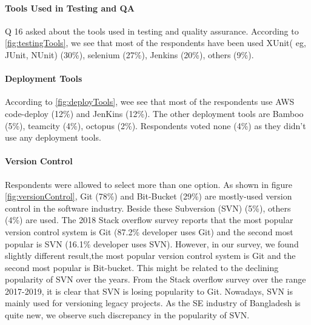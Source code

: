 \paragraph{Tools Used in Testing and QA}
Q 16 asked about the tools used in testing and quality assurance. According to \ref{fig:testingTools}, we see that most of the respondents have been used XUnit( eg, JUnit, NUnit) (30\%), selenium (27\%), Jenkins (20\%), others (9\%).



\paragraph{Deployment Tools}
According to \ref{fig:deployTools}, wee see that most of the respondents use AWS code-deploy (12\%) and JenKins (12\%). The other deployment tools are Bamboo (5\%), teamcity (4\%), octopus (2\%). Respondents voted none (4\%) as they didn’t use any deployment tools.


\paragraph{Version Control}
Respondents were allowed to select more than one option. As shown in figure \ref{fig:versionControl}, Git (78\%) and Bit-Bucket (29\%) are mostly-used version control in the software industry. Beside these Subversion (SVN) (5\%), others (4\%) are used.  The 2018 Stack overflow survey\cite{StackoverflowSurvey2018} reports that  the most popular version control system is Git (87.2\% developer uses Git) and the second most popular is SVN (16.1\% developer uses SVN). However, in our survey, we found slightly different result,the most popular version control system is Git and the second most popular is Bit-bucket. This might be related  to the declining popularity of SVN over the years. From the Stack overflow survey over the range 2017-2019, it is clear that SVN is losing popularity to Git. Nowadays, SVN is mainly used for versioning legacy projects. As the SE industry of Bangladesh is quite new, we observe such discrepancy in the popularity of SVN.

